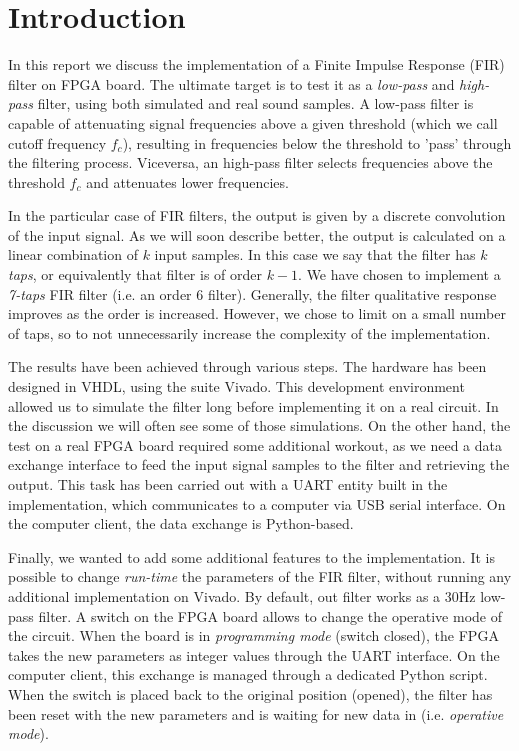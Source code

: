\section{Introduction}
\label{sec:intro}

In this report we discuss the implementation of a Finite Impulse Response (FIR) filter on FPGA board. The ultimate target is to test it as a \emph{low-pass} and \emph{high-pass} filter, using both simulated and real sound samples. A low-pass filter is capable of attenuating signal frequencies above a given threshold (which we call cutoff frequency $f_c$), resulting in frequencies below the threshold to 'pass' through the filtering process. Viceversa, an high-pass filter selects frequencies above the threshold $f_c$ and attenuates lower frequencies.

In the particular case of FIR filters, the output is given by a discrete convolution of the input signal. As we will soon describe better, the output is calculated on a linear combination of $k$ input samples. In this case we say that the filter has $k$ \emph{taps}, or equivalently that filter is of order $k-1$. We have chosen to implement a \emph{7-taps} FIR filter (i.e. an order 6 filter). Generally, the filter qualitative response improves as the order is increased. However, we chose to limit on a small number of taps, so to not unnecessarily increase the complexity of the implementation.

The results have been achieved through various steps. The hardware has been designed in VHDL, using the suite Vivado. This development environment allowed us to simulate the filter long before implementing it on a real circuit. In the discussion we will often see some of those simulations. On the other hand, the test on a real FPGA board required some additional workout, as we need a data exchange interface to feed the input signal samples to the filter and retrieving the output. This task has been carried out with a UART entity built in the implementation, which communicates to a computer via USB serial interface. On the computer client, the data exchange is Python-based.

Finally, we wanted to add some additional features to the implementation. It is possible to change \emph{run-time} the parameters of the FIR filter, without running any additional implementation on Vivado. By default, out filter works as a 30Hz low-pass filter. A switch on the FPGA board allows to change the operative mode of the circuit. When the board is in \emph{programming mode} (switch closed), the FPGA takes the new parameters as integer values through the UART interface. On the computer client, this exchange is managed through a dedicated Python script. When the switch is placed back to the original position (opened), the filter has been reset with the new parameters and is waiting for new data in (i.e. \emph{operative mode}).